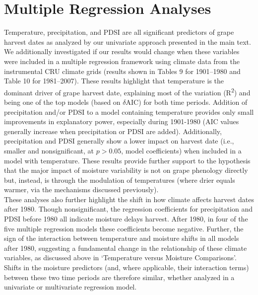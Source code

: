 \documentclass[12pt]{article}
\begin{document}
\section*{Multiple Regression Analyses} 
\noindent Temperature, precipitation, and PDSI are all significant predictors of grape harvest dates as analyzed by our univariate approach presented in the main text. We additionally investigated if our results would change when these variables were included in a multiple regression framework using climate data from the instrumental CRU climate grids (results shown in Tables 9 for 1901--1980 and Table 10  for 1981--2007). These results highlight that temperature is the dominant driver of grape harvest date, explaining most of the variation (R\textsuperscript{2}) and being one of the top models (based on $\delta$AIC) for both time periods. Addition of precipitation and/or PDSI to a model containing temperature provides only small improvements in explanatory power, especially during 1901-1980 (AIC values generally increase when precipitation or PDSI are added). Additionally, precipitation and PDSI generally show a lower impact on harvest date (i.e., smaller and nonsignificant, at $p>0.05$, model coefficients) when included in a model with temperature. These results provide further support to the hypothesis that the major impact of moisture variability is not on grape phenology directly but, instead, is through the modulation of temperatures (where drier equals warmer, via the mechanisms discussed previously).\\
\indent These analyses also further highlight the shift in how climate affects harvest dates after 1980. Though nonsignificant, the regression coefficients for precipitation and PDSI before 1980 all indicate moisture delays harvest. After 1980, in four of the five multiple regression models these coefficients become negative. Further, the sign of the interaction between temperature and moisture shifts in all models after 1980, suggesting a fundamental change in the relationship of these climate variables, as discussed above in `Temperature versus Moisture Comparisons'. Shifts in the moisture predictors (and, where applicable, their interaction terms) between these two time periods are therefore similar, whether analyzed in a univariate or multivariate regression model.


\end{document}
